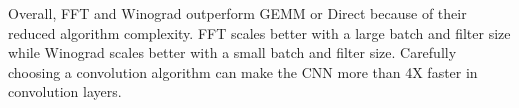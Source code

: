 Overall, \textsf{FFT} and \textsf{Winograd} outperform \textsf{GEMM} or \textsf{Direct} because of their reduced algorithm complexity. \textsf{FFT} scales better with a large batch and filter size while \textsf{Winograd} scales better with a small batch and filter size. Carefully choosing a convolution algorithm can make the CNN more than 4X faster in convolution layers. 